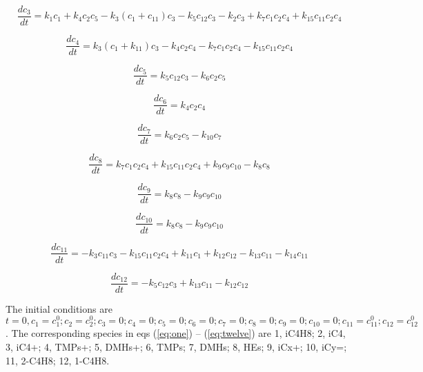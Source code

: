 \documentclass{svproc}
\begin{document}
\begin{equation}
  \frac{dc_3}{dt} = k_1c_1 + k_4c_2c_5 - k_3(c_1 + c_{11})c_3 - k_{5}c_{12}c_3 - k_2c_3 + k_7c_1c_2c_4 + k_{15}c_{11}c_2c_4
  \label{eq:three}
\end{equation}

\begin{equation}
  \frac{dc_4}{dt} = k_3(c_1 + k_{11})c_3 - k_4c_2c_4 - k_{7}c_{1}c_2c_4 - k_{15}c_{11}c_2c_4
  \label{eq:four}
\end{equation}

\begin{equation}
  \frac{dc_5}{dt} = k_5c_{12}c_3 - k_{6}c_2c_5
  \label{eq:five}
\end{equation}

\begin{equation}
  \frac{dc_6}{dt} = k_4c_{2}c_4
  \label{eq:six}
\end{equation}

\begin{equation}
  \frac{dc_7}{dt} = k_6c_{2}c_5 - k_{10}c_7
  \label{eq:seven}
\end{equation}

\begin{equation}
  \frac{dc_8}{dt} = k_7c_{1}c_2c_4 + k_{15}c_{11}c_2c_4 + k_9c_9c_{10} - k_8c_8
  \label{eq:eight}
\end{equation}

\begin{equation}
  \frac{dc_9}{dt} = k_8c_{8} - k_{9}c_{9}c_{10}
  \label{eq:nine}
\end{equation}

\begin{equation}
  \frac{dc_{10}}{dt} = k_8c_{8} - k_{9}c_{9}c_{10}
  \label{eq:ten}
\end{equation}

\begin{equation}
  \frac{dc_{11}}{dt} = -k_3c_{11}c_3 - k_{15}c_{11}c_{2}c_4 + k_{11}c_1 + k_{12}c_{12} - k_{13}c_{11} - k_{14}c_{11}
  \label{eq:eleven}
\end{equation}

\begin{equation}
  \frac{dc_{12}}{dt} = -k_5c_{12}c_3 + k_{13}c_{11} - k_{12}c_{12}
  \label{eq:twelve}
\end{equation}

The initial conditions are $t = 0, c_1 = c_1^0; c_2=c_2^0; c_3 = 0; c_4 = 0; c_5= 0; c_6 = 0; c_7 = 0; c_8 = 0; c_9 = 0; c_{10} = 0; c_{11}=c_{11}^0; c_{12} = c_{12}^0$.
The corresponding species in eqs (\ref{eq:one}) -- (\ref{eq:twelve}) are 1, iC4H8; 2, iC4, 3, iC4+; 4, TMPs+; 5, DMHs+; 6, TMPs; 7, DMHs; 8, HEs; 9, iCx+; 10, iCy=; 11, 2-C4H8; 12, 1-C4H8.
\end{document}
